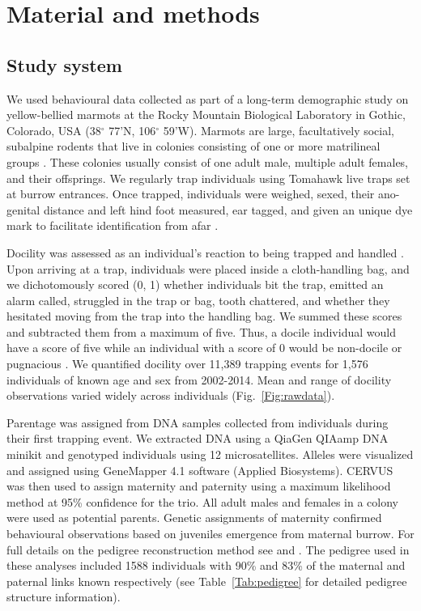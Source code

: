 \documentclass[a4paper,12pt,twoside]{article}
\begin{document}
	\section*{Material and methods}
	\subsection*{Study system}
	We used behavioural data collected as part of a long-term demographic study on yellow-bellied marmots at the Rocky Mountain Biological Laboratory in Gothic, Colorado, USA (38$^{\circ}$ 77’N, 106$^{\circ}$ 59’W).
	Marmots are large, facultatively social, subalpine rodents that live in colonies consisting of one or more matrilineal groups \citep{Frase1980, Armitage2014}. 
	These colonies usually consist of one adult male, multiple adult females, and their offsprings. 
	We regularly trap individuals using Tomahawk live traps set at burrow entrances. 
	Once trapped, individuals were weighed, sexed, their ano-genital distance and left hind foot measured, ear tagged, and given an unique dye mark to facilitate identification from afar \citep{Blumstein2009}. 
	
	Docility was assessed as an individual’s reaction to being trapped and handled \citep{Reale2007, Petelle2013}.
	Upon arriving at a trap, individuals were placed inside a cloth-handling bag, and we dichotomously scored (0, 1) whether individuals bit the trap, emitted an alarm called, struggled in the trap or bag, tooth chattered, and whether they hesitated moving from the trap into the handling bag. 
	We summed these scores and subtracted them from a maximum of five. 
	Thus, a docile individual would have a score of five while an individual with a score of 0 would be non-docile or pugnacious \citep{Reale2007}. 
	We quantified docility over 11,389 trapping events for 1,576 individuals of known age and sex from 2002-2014. Mean and range of docility observations varied widely across individuals (Fig.~\ref{Fig:rawdata}).
	
	Parentage was assigned from DNA samples collected from individuals during their first trapping event.
	We extracted DNA using a QiaGen QIAamp DNA minikit and genotyped individuals using 12 microsatellites. 
	Alleles were visualized and assigned using GeneMapper 4.1 software (Applied Biosystems). 
	CERVUS \citep{Kalinowski2007} was then used to assign maternity and paternity using a maximum likelihood method at 95\% confidence for the trio. All adult males and females in a colony were used as potential parents.
	Genetic assignments of maternity confirmed behavioural observations based on juveniles emergence from maternal burrow.
	For full details on the pedigree reconstruction method see \cite{Olson2012} and \cite{Blumstein2010}.
	The pedigree used in these analyses included 1588 individuals with 90\% and 83\% of the maternal and paternal links known respectively (see Table~\ref{Tab:pedigree} for detailed pedigree structure information).
	
\end{document}
